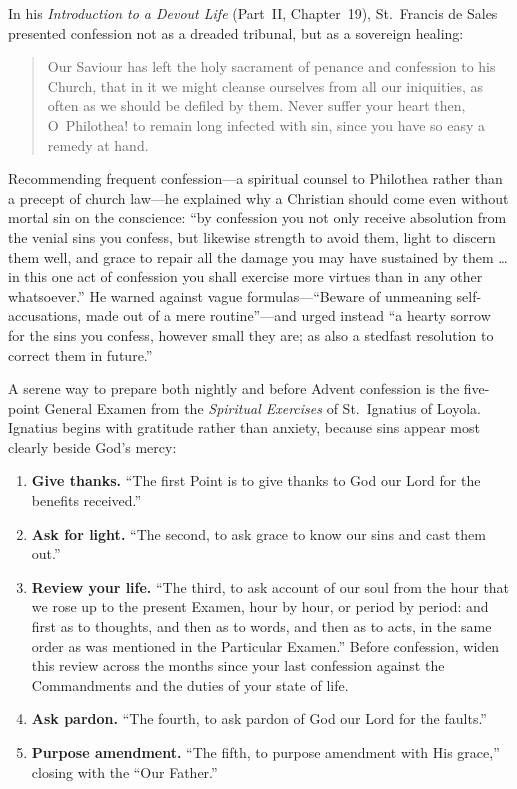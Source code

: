 In his \textit{Introduction to a Devout Life} (Part~II, Chapter~19), St.~Francis de Sales presented confession not as a dreaded tribunal, but as a sovereign healing:

\begin{quote}
Our Saviour has left the holy sacrament of penance and confession to his Church, that in it we might cleanse ourselves from all our iniquities, as often as we should be defiled by them. Never suffer your heart then, O~Philothea! to remain long infected with sin, since you have so easy a remedy at hand.
\end{quote}

Recommending frequent confession---a spiritual counsel to Philothea rather than a precept of church law---he explained why a Christian should come even without mortal sin on the conscience: ``by confession you not only receive absolution from the venial sins you confess, but likewise strength to avoid them, light to discern them well, and grace to repair all the damage you may have sustained by them \ldots{} in this one act of confession you shall exercise more virtues than in any other whatsoever.'' He warned against vague formulas---``Beware of unmeaning self-accusations, made out of a mere routine''---and urged instead ``a hearty sorrow for the sins you confess, however small they are; as also a stedfast resolution to correct them in future.''

A serene way to prepare both nightly and before Advent confession is the five-point General Examen from the \textit{Spiritual Exercises} of St.~Ignatius of Loyola. Ignatius begins with gratitude rather than anxiety, because sins appear most clearly beside God's mercy:

\begin{enumerate}
\item \textbf{Give thanks.} ``The first Point is to give thanks to God our Lord for the benefits received.''
\item \textbf{Ask for light.} ``The second, to ask grace to know our sins and cast them out.''
\item \textbf{Review your life.} ``The third, to ask account of our soul from the hour that we rose up to the present Examen, hour by hour, or period by period: and first as to thoughts, and then as to words, and then as to acts, in the same order as was mentioned in the Particular Examen.'' Before confession, widen this review across the months since your last confession against the Commandments and the duties of your state of life.
\item \textbf{Ask pardon.} ``The fourth, to ask pardon of God our Lord for the faults.''
\item \textbf{Purpose amendment.} ``The fifth, to purpose amendment with His grace,'' closing with the ``Our Father.''
\end{enumerate}

